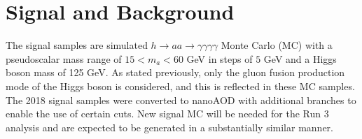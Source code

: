 \documentclass[12pt]{article}
\begin{document}

\section{Signal and Background}
The signal samples are simulated $h \rightarrow aa \rightarrow \gamma\gamma\gamma\gamma$ Monte Carlo (MC) with a pseudoscalar mass range of $15 < m_a < 60$ GeV in steps of $5$ GeV and a Higgs boson mass of 125 GeV. As stated previously, only the gluon fusion production mode of the Higgs boson is considered, and this is reflected in these MC samples. The 2018 signal samples were converted to nanoAOD with additional branches to enable the use of certain cuts. New signal MC will be needed for the Run 3 analysis and are expected to be generated in a substantially similar manner.\par
\end{document}
